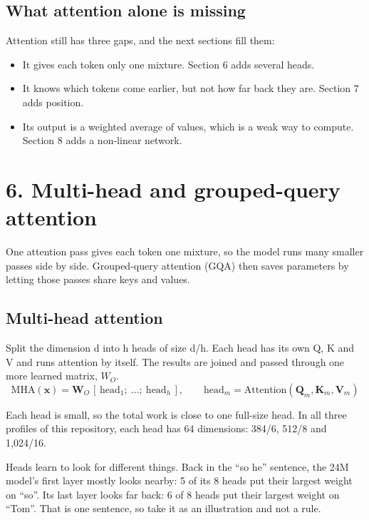 \documentclass[11pt,a4paper]{article}
\begin{document}
\subsection*{What attention alone is missing}
{}

Attention still has three gaps, and the next sections fill them:

\begin{itemize}
\item It gives each token only one mixture. Section 6 adds several heads.
\item It knows which tokens come earlier, but not how far back they are. Section 7 adds position.
\item Its output is a weighted average of values, which is a weak way to compute. Section 8 adds a non-linear network.
\end{itemize}

\section*{6. Multi-head and grouped-query attention}
{}

One attention pass gives each token one mixture, so the model runs many smaller passes side by side. Grouped-query attention (GQA) then saves parameters by letting those passes share keys and values.

\subsection*{Multi-head attention}
{}

Split the dimension d into h heads of size d/h. Each head has its own Q, K and V and runs attention by itself. The results are joined and passed through one more learned matrix, $W_O$.
\[
\mathrm{MHA}(\mathbf{x}) = \mathbf{W}_O\,[\,\mathrm{head}_1;\ \dots;\ \mathrm{head}_h\,],\qquad \mathrm{head}_m=\mathrm{Attention}(\mathbf{Q}_m,\mathbf{K}_m,\mathbf{V}_m)
\]

Each head is small, so the total work is close to one full-size head. In all three profiles of this repository, each head has 64 dimensions: 384/6, 512/8 and 1,024/16.

Heads learn to look for different things. Back in the “so he” sentence, the 24M model's first layer mostly looks nearby: 5 of its 8 heads put their largest weight on “so”. Its last layer looks far back: 6 of 8 heads put their largest weight on “Tom”. That is one sentence, so take it as an illustration and not a rule.
\end{document}

